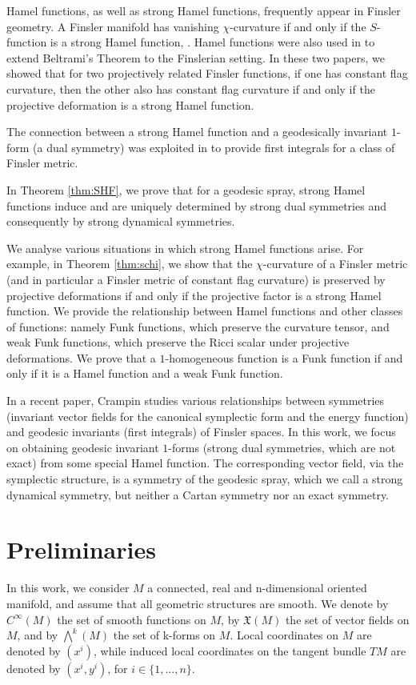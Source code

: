 \documentclass[oneside,english]{amsart}
\theoremstyle{definition}
\theoremstyle{plain}
\theoremstyle{plain}
\theoremstyle{plain}
\theoremstyle{remark}
\theoremstyle{remark}
\theoremstyle{remark}
\begin{document}
Hamel functions, as well as strong Hamel functions, frequently appear in Finsler geometry. A Finsler manifold has vanishing $\chi$-curvature if and only if the $S$-function is a strong Hamel function, \cite{Shen21}. Hamel functions were also used in \cite{BC20a, BC20b} to extend Beltrami's Theorem to the Finslerian setting. In these two papers, we showed that for two projectively related Finsler functions, if one has constant flag curvature, then the other also has constant flag curvature if and only if the projective deformation is a strong Hamel function.

The connection between a strong Hamel function and a geodesically invariant $1$-form (a dual symmetry) was exploited in \cite{BCC21} to provide first integrals for a class of Finsler metric.

In Theorem \ref{thm:SHF}, we prove that for a geodesic spray, strong Hamel functions induce and are uniquely determined by strong dual symmetries and consequently by strong dynamical symmetries. 

We analyse various situations in which strong Hamel functions arise. For example, in Theorem \ref{thm:schi}, we show that the $\chi$-curvature of a Finsler metric (and in particular a Finsler metric of constant flag curvature) is preserved by projective deformations if and only if the projective factor is a strong Hamel function. We provide the relationship between Hamel functions and other classes of functions: namely Funk functions, which preserve the curvature tensor, and weak Funk functions, which preserve the Ricci scalar under projective deformations. We prove that a $1$-homogeneous function is a Funk function if and only if it is a Hamel function and a weak Funk function.

In a recent paper, Crampin \cite{Crampin24} studies various relationships between symmetries (invariant vector fields for the canonical symplectic form and the energy function) and geodesic invariants (first integrals) of Finsler spaces. In this work, we focus on obtaining geodesic invariant $1$-forms (strong dual symmetries, which are not exact) from some special Hamel function. The corresponding vector field, via the symplectic structure, is a symmetry of the geodesic spray, which we call a strong dynamical symmetry, but neither a Cartan symmetry nor an exact symmetry. 

\section{Preliminaries}
In this work, we consider $M$ a connected, real and n-dimensional oriented manifold, and assume that all geometric structures are smooth. We denote by $C^\infty(M)$ the set of smooth functions on $M$, by $\mathfrak{X}(M)$ the set of vector fields on $M$, and by $\bigwedge^k(M)$ the set of k-forms on $M$.
Local coordinates on $M$ are denoted by $(x^i)$, while induced local coordinates on the tangent bundle $TM$ are denoted by $(x^i, y^i)$, for $i\in \{1,...,n\}$.
\end{document}
